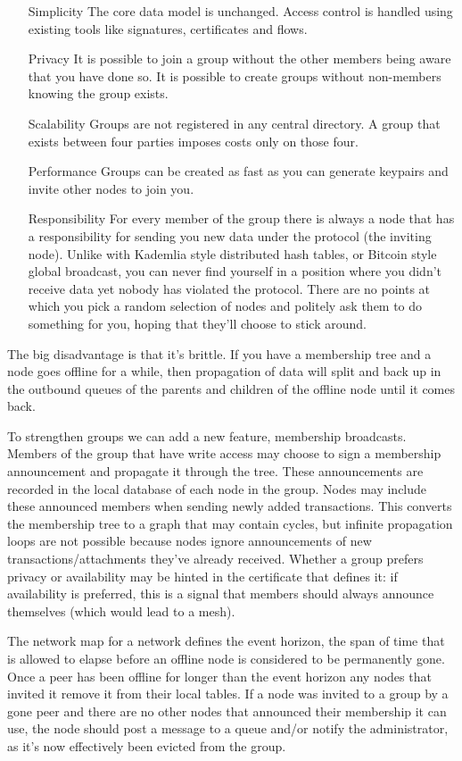 \documentclass{article}
\begin{document}
\begin{itemize}
\item [Simplicity] The core data model is unchanged. Access control is handled using existing tools like signatures, certificates and flows.
\item [Privacy] It is possible to join a group without the other members being aware that you have done so. It is possible to create groups without non-members knowing the group exists.
\item [Scalability] Groups are not registered in any central directory. A group that exists between four parties imposes costs only on those four.
\item [Performance] Groups can be created as fast as you can generate keypairs and invite other nodes to join you.
\item [Responsibility] For every member of the group there is always a node that has a responsibility for sending you
new data under the protocol (the inviting node). Unlike with Kademlia style distributed hash tables, or Bitcoin style
global broadcast, you can never find yourself in a position where you didn't receive data yet nobody has violated the
protocol. There are no points at which you pick a random selection of nodes and politely ask them to do something for
you, hoping that they'll choose to stick around.
\end{itemize}

The big disadvantage is that it's brittle. If you have a membership tree and a node goes offline for a while,
then propagation of data will split and back up in the outbound queues of the parents and children of the offline
node until it comes back.

To strengthen groups we can add a new feature, membership broadcasts. Members of the group that have write access may
choose to sign a membership announcement and propagate it through the tree. These announcements are recorded in the
local database of each node in the group. Nodes may include these announced members when sending newly added
transactions. This converts the membership tree to a graph that may contain cycles, but infinite propagation loops are
not possible because nodes ignore announcements of new transactions/attachments they've already received. Whether a group
prefers privacy or availability may be hinted in the certificate that defines it: if availability is preferred, this is
a signal that members should always announce themselves (which would lead to a mesh).

The network map for a network defines the event horizon, the span of time that is allowed to elapse before an offline
node is considered to be permanently gone. Once a peer has been offline for longer than the event horizon any nodes that
invited it remove it from their local tables. If a node was invited to a group by a gone peer and there are no other
nodes that announced their membership it can use, the node should post a message to a queue and/or notify the
administrator, as it's now effectively been evicted from the group.
\end{document}
